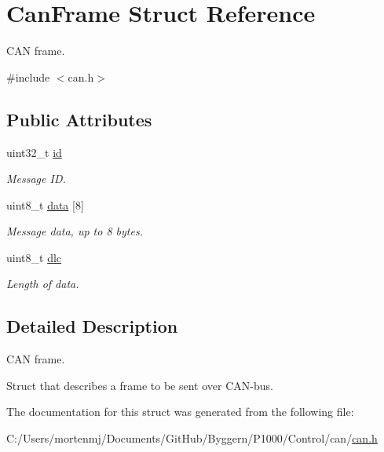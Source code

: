\hypertarget{struct_can_frame}{\section{Can\-Frame Struct Reference}
\label{struct_can_frame}
}


C\-A\-N frame.  




{\ttfamily \#include $<$can.\-h$>$}

\subsection*{Public Attributes}
\begin{DoxyCompactItemize}
\item 
\hypertarget{struct_can_frame_aa850629d26a09531d2f40bd2b30b77f7}{uint32\-\_\-t \hyperlink{struct_can_frame_aa850629d26a09531d2f40bd2b30b77f7}{id}}\label{struct_can_frame_aa850629d26a09531d2f40bd2b30b77f7}

\begin{DoxyCompactList}\small\item\em Message I\-D. \end{DoxyCompactList}\item 
\hypertarget{struct_can_frame_adb669739b80159e1014ea86419fe8852}{uint8\-\_\-t \hyperlink{struct_can_frame_adb669739b80159e1014ea86419fe8852}{data} \mbox{[}8\mbox{]}}\label{struct_can_frame_adb669739b80159e1014ea86419fe8852}

\begin{DoxyCompactList}\small\item\em Message data, up to 8 bytes. \end{DoxyCompactList}\item 
\hypertarget{struct_can_frame_aa896aaac27a424ba8e46c50e7bdb065d}{uint8\-\_\-t \hyperlink{struct_can_frame_aa896aaac27a424ba8e46c50e7bdb065d}{dlc}}\label{struct_can_frame_aa896aaac27a424ba8e46c50e7bdb065d}

\begin{DoxyCompactList}\small\item\em Length of data. \end{DoxyCompactList}\end{DoxyCompactItemize}


\subsection{Detailed Description}
C\-A\-N frame. 

Struct that describes a frame to be sent over C\-A\-N-\/bus. 

The documentation for this struct was generated from the following file\-:\begin{DoxyCompactItemize}
\item 
C\-:/\-Users/mortenmj/\-Documents/\-Git\-Hub/\-Byggern/\-P1000/\-Control/can/\hyperlink{can_8h}{can.\-h}\end{DoxyCompactItemize}
